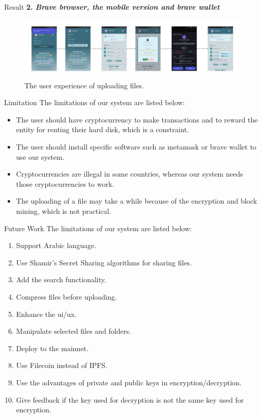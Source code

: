 \documentclass[aspectratio=169,usenames,dvipsnames,pdftex]{beamer}
\begin{document}
  \begin{frame}{Result}
    \textbf{2. \textit{Brave browser, the mobile version and brave wallet}} \\

    \begin{figure}
      \includegraphics[width=\textwidth]{upload_result.png}
      \caption{The user experience of uploading files.}
    \end{figure}
  \end{frame}

  \begin{frame}{Limitation}
    The limitations of our system are listed below: \\[8pt]

    \begin{itemize}
    \item The user should have cryptocurrency to make transactions and to reward the entity for renting their hard disk, which is a constraint.
    \item The user should install specific software such as metamask or brave wallet to use our system.
    \item Cryptocurrencies are illegal in some countries, whereas our system needs those cryptocurrencies to work.
    \item The uploading of a file may take a while because of the encryption and block mining, which is not practical.
    \end{itemize}
  \end{frame}

  \begin{frame}{Future Work}
    The limitations of our system are listed below: \\[8pt]

    \begin{enumerate}
    \item Support Arabic language.
    \item Use Shamir's Secret Sharing algorithms for sharing files.
    \item Add the search functionality.
    \item Compress files before uploading.
    \item Enhance the ui/ux.
    \item Manipulate selected files and folders.
    \item Deploy to the mainnet.
    \item Use Filecoin instead of IPFS.
    \item Use the advantages of private and public keys in encryption/decryption.
    \item Give feedback if the key used for decryption is not the same key used for encryption.
    \end{enumerate}
  \end{frame}
\end{document}
